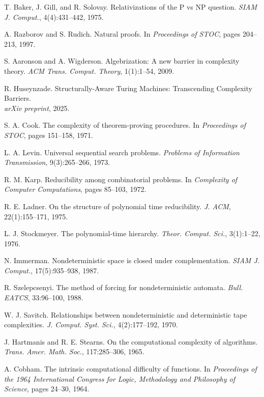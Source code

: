 \documentclass[11pt]{article}
\theoremstyle{definition}
\begin{document}
\begin{thebibliography}{99}
 T. Baker, J. Gill, and R. Solovay. Relativizations of the P vs NP question. \emph{SIAM J. Comput.}, 4(4):431--442, 1975.

 A. Razborov and S. Rudich. Natural proofs. In \emph{Proceedings of STOC}, pages 204--213, 1997.

 S. Aaronson and A. Wigderson. Algebrization: A new barrier in complexity theory. \emph{ACM Trans. Comput. Theory}, 1(1):1--54, 2009.

 R. Huseynzade. Structurally-Aware Turing Machines: Transcending Complexity Barriers. \\
\emph{arXiv preprint}, 2025.

 S. A. Cook. The complexity of theorem-proving procedures. In \emph{Proceedings of STOC}, pages 151--158, 1971.

 L. A. Levin. Universal sequential search problems. \emph{Problems of Information Transmission}, 9(3):265--266, 1973.

 R. M. Karp. Reducibility among combinatorial problems. In \emph{Complexity of Computer Computations}, pages 85--103, 1972.

 R. E. Ladner. On the structure of polynomial time reducibility. \emph{J. ACM}, 22(1):155--171, 1975.

 L. J. Stockmeyer. The polynomial-time hierarchy. \emph{Theor. Comput. Sci.}, 3(1):1--22, 1976.

 N. Immerman. Nondeterministic space is closed under complementation. \emph{SIAM J. Comput.}, 17(5):935--938, 1987.

 R. Szelepcsenyi. The method of forcing for nondeterministic automata. \emph{Bull. EATCS}, 33:96--100, 1988.

 W. J. Savitch. Relationships between nondeterministic and deterministic tape complexities. \emph{J. Comput. Syst. Sci.}, 4(2):177--192, 1970.

 J. Hartmanis and R. E. Stearns. On the computational complexity of algorithms. \emph{Trans. Amer. Math. Soc.}, 117:285--306, 1965.

 A. Cobham. The intrinsic computational difficulty of functions. In \emph{Proceedings of the 1964 International Congress for Logic, Methodology and Philosophy of Science}, pages 24--30, 1964.


\end{thebibliography}
\end{document}
